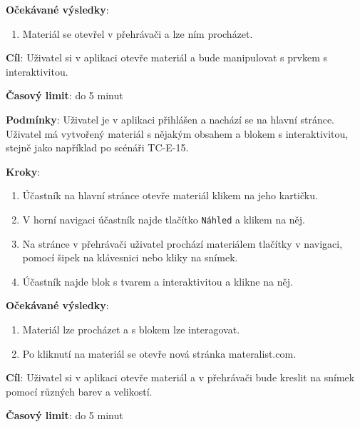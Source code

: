 \textbf{Očekávané výsledky}:

\begin{enumerate}[leftmargin=1.4cm]
    \item Materiál se otevřel v přehrávači a lze ním procházet.
\end{enumerate}



\vspace{1em}

\textbf{Cíl}: Uživatel si v aplikaci otevře materiál a bude manipulovat s prvkem s interaktivitou.

\textbf{Časový limit}: do 5 minut

\textbf{Podmínky}:  Uživatel je v aplikaci přihlášen a nachází se na hlavní stránce.  Uživatel má vytvořený materiál s nějakým obsahem a blokem s interaktivitou, stejně jako například po scénáři TC-E-15.

\textbf{Kroky}:

\begin{enumerate}[leftmargin=1.4cm]
    \item Účastník na hlavní stránce otevře materiál klikem na jeho kartičku.
    \item V horní navigaci účastník najde tlačítko \verb|Náhled| a klikem na něj.
    \item Na stránce v přehrávači uživatel prochází materiálem tlačítky v navigaci, pomocí šipek na klávesnici nebo kliky na snímek.
    \item Účastník najde blok s tvarem a interaktivitou a klikne na něj.
\end{enumerate}

\textbf{Očekávané výsledky}:

\begin{enumerate}[leftmargin=1.4cm]
    \item Materiál lze procházet a s blokem lze interagovat.
    \item Po kliknutí na materiál se otevře nová stránka materalist.com.
\end{enumerate}






\vspace{1em}

\textbf{Cíl}: Uživatel si v aplikaci otevře materiál a v přehrávači bude kreslit na snímek pomocí různých barev a velikostí.

\textbf{Časový limit}: do 5 minut

